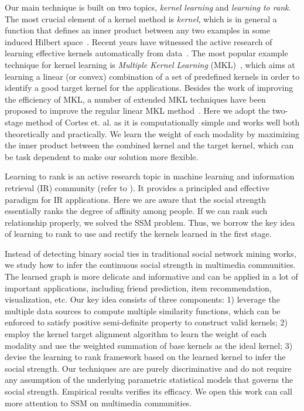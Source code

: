 Our main technique is built on two topics, {\em kernel learning} and {\em learning to rank}. The most crucial element of a kernel method is {\it kernel}, which
is in general a function that defines an inner product between any two examples in some induced Hilbert space~\cite{Cristianini00}. Recent years have witnessed
the active research of learning effective kernels automatically from data~\cite{jmlr/LanckrietCBGJ03}. The most popular example technique for kernel learning
is
{\em Multiple Kernel Learning} (MKL)~\cite{jmlr/LanckrietCBGJ03,jmlr/SonnenburgRSS06,jmlr/RakotomamonjyBCG08}, which aims at learning a linear
(or convex) combination of a set of predefined kernels in order to identify a good target kernel for the applications. Besides the work of improving the
efficiency of MKL, a number of extended MKL techniques have been proposed to improve the regular linear MKL
method~\cite{icml/VarmaB09,nips/CortesMR09,nips/KloftBSLMZ09,icml/CortesMR10}. Here we adopt the two-stage method of Cortes et. al.\cite{icml/CortesMR10} as it
is computationally simple and works well both theoretically and practically. We learn the weight of each modality by maximizing the inner product between the
combined kernel and the target kernel, which can be task dependent to make our solution more flexible.

Learning to rank is an active research topic in machine learning and information retrieval (IR) community (refer to \cite{sigir/Liu10}). It provides a
principled and effective paradigm for IR applications. Here we are aware that the social strength essentially ranks the degree of affinity among people. If we
can rank such relationship properly, we solved the SSM problem. Thus, we borrow the key idea of learning to rank to use and rectify the kernels learned in the first stage.

Instead of detecting binary social ties in traditional social network mining works, we study how to infer the continuous social strength in
multimedia communities. The learned graph is more delicate and informative and can be applied in a lot of important applications, including friend prediction, item recommendation, visualization, etc. Our key idea consists of three components: 1) leverage the multiple data sources to compute multiple similarity functions, which can be enforced to satisfy positive semi-definite property to construct valid kernels; 2) employ the kernel target alignment algorithm to learn the weight of each modality and use the weighted summation of base kernels as the ideal kernel; 3) devise the learning to rank framework based on the learned kernel to infer the social strength. Our techniques are are purely discriminative and do not require any assumption of the underlying parametric statistical models that governs the social strength. Empirical results verifies its efficacy. We open this work can call more attention to SSM on multimedia communities.
